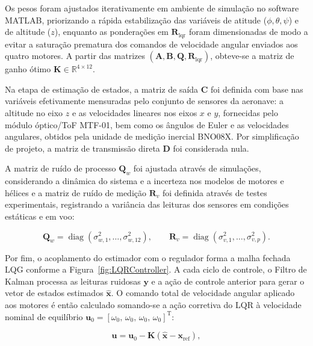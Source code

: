 Os pesos foram ajustados iterativamente em ambiente de simulação no software MATLAB, priorizando a rápida estabilização das variáveis de atitude ($\phi, \theta, \psi$) e de altitude ($z$), enquanto as ponderações em $\mathbf{R}_{\mathrm{lqr}}$ foram dimensionadas de modo a evitar a saturação prematura dos comandos de velocidade angular enviados aos quatro motores. A partir das matrizes $(\mathbf{A}, \mathbf{B}, \mathbf{Q}, \mathbf{R}_{\mathrm{lqr}})$, obteve-se a matriz de ganho ótimo $\mathbf{K} \in \mathbb{R}^{4\times 12}$.

Na etapa de estimação de estados, a matriz de saída $\mathbf{C}$ foi definida com base nas variáveis efetivamente mensuradas pelo conjunto de sensores da aeronave: a altitude no eixo $z$ e as velocidades lineares nos eixos $x$ e $y$, fornecidas pelo módulo óptico/ToF MTF-01, bem como os ângulos de Euler e as velocidades angulares, obtidos pela unidade de medição inercial BNO08X. Por simplificação de projeto, a matriz de transmissão direta $\mathbf{D}$ foi considerada nula.

A matriz de ruído de processo $\mathbf{Q}_w$ foi ajustada através de simulações, considerando a dinâmica do sistema e a incerteza nos modelos de motores e hélices e a matriz de ruído de medição $\mathbf{R}_v$ foi definida através de testes experimentais, registrando a variância das leituras dos sensores em condições estáticas e em voo:

\begin{equation}\label{eq:matrizes_kalman_metodo}
\mathbf{Q}_w = \operatorname{diag}\left(\sigma_{w,1}^2, \dots, \sigma_{w,12}^2\right), \qquad
\mathbf{R}_v = \operatorname{diag}\left(\sigma_{v,1}^2, \dots, \sigma_{v,p}^2\right).
\end{equation}

Por fim, o acoplamento do estimador com o regulador forma a malha fechada LQG conforme a Figura~\ref{fig:LQRController}. A cada ciclo de controle, o Filtro de Kalman processa as leituras ruidosas $\mathbf{y}$ e a ação de controle anterior para gerar o vetor de estados estimados $\hat{\mathbf{x}}$. O comando total de velocidade angular aplicado aos motores é então calculado somando-se a ação corretiva do LQR à velocidade nominal de equilíbrio $\mathbf{u}_0 = [\omega_0,\, \omega_0,\, \omega_0,\, \omega_0]^{\mathrm{T}}$:

\begin{equation}\label{eq:comando_final_motores}
\mathbf{u} = \mathbf{u}_0 - \mathbf{K}\left(\hat{\mathbf{x}} - \mathbf{x}_{\mathrm{ref}}\right),
\end{equation}

